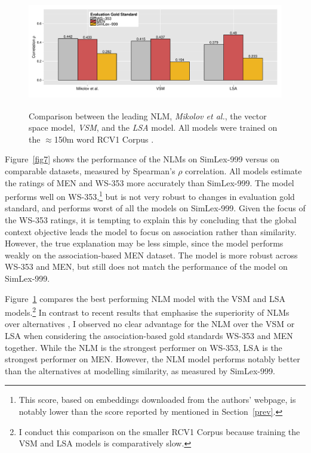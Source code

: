 \begin{figure}[ht]  \includegraphics[width = \textwidth,height=5cm]{Chapter_2/Figure_2B_CL}  \caption{\label{fig8}Comparison between the leading NLM, \emph{Mikolov et al.}, the vector space model, \emph{VSM}, and the \emph{LSA} model. All models were trained on the $\approx$150m word RCV1 Corpus \protect\citep{lewis2004rcv1}.}\end{figure}

Figure~\ref{fig7} shows the performance of the NLMs on SimLex-999 versus on comparable datasets, measured by Spearman's \(\rho\) correlation. All models estimate the ratings of MEN and WS-353 more accurately than SimLex-999. The \cite{huang2012improving} model performs well on WS-353,\footnote{This score, based on embeddings downloaded from the authors' webpage, is notably lower than the score reported by \cite{huang2012improving} mentioned in Section~\ref{prev}.} but is not very robust to changes in evaluation gold standard, and performs worst of all the models on SimLex-999. Given the focus of the WS-353 ratings, it is tempting to explain this by concluding that the global context objective leads the \cite{huang2012improving} model to focus on association rather than similarity. However, the true explanation may be less simple, since the \cite{huang2012improving} model performs weakly on the association-based MEN dataset. The \cite{collobert2008unified} model is more robust across WS-353 and MEN, but still does not match the performance of the \cite{mikolov2013efficient} model on SimLex-999. 

Figure~\ref{fig8} compares the best performing NLM model \citep{mikolov2013efficient} with the VSM and LSA models.\footnote{I conduct this comparison on the smaller RCV1 Corpus \citep{lewis2004rcv1} because training the VSM and LSA models is comparatively slow.}  In contrast to recent results that emphasise the superiority of NLMs over alternatives \citep{baroni2014don}, I observed no clear advantage for the NLM over the VSM or LSA when considering the association-based gold standards WS-353 and MEN together. While the NLM is the strongest performer on WS-353, LSA is the strongest performer on MEN. However, the NLM model performs notably better than the alternatives at modelling similarity, as measured by SimLex-999. 

